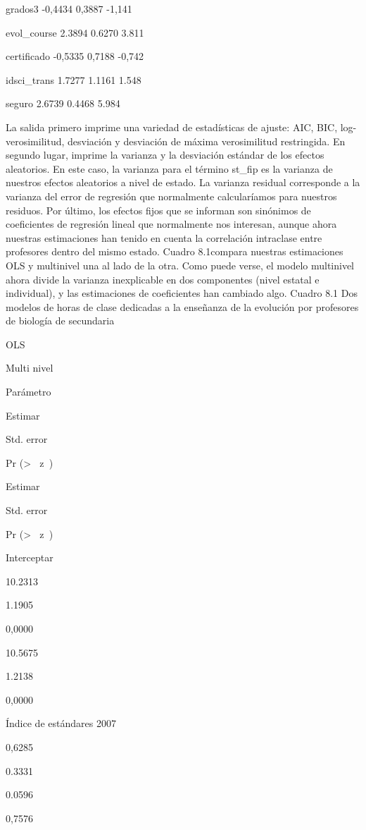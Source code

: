 \documentclass[
]{book}
\begin{document}
grados3 -0,4434 0,3887 -1,141

evol\_course 2.3894 0.6270 3.811

certificado -0,5335 0,7188 -0,742

idsci\_trans 1.7277 1.1161 1.548

seguro 2.6739 0.4468 5.984

La salida primero imprime una variedad de estadísticas de ajuste: AIC, BIC, log-verosimilitud, desviación y desviación de máxima verosimilitud restringida. En segundo lugar, imprime la varianza y la desviación estándar de los efectos aleatorios. En este caso, la varianza para el término st\_fip es la varianza de nuestros efectos aleatorios a nivel de estado. La varianza residual corresponde a la varianza del error de regresión que normalmente calcularíamos para nuestros residuos. Por último, los efectos fijos que se informan son sinónimos de coeficientes de regresión lineal que normalmente nos interesan, aunque ahora nuestras estimaciones han tenido en cuenta la correlación intraclase entre profesores dentro del mismo estado. Cuadro 8.1compara nuestras estimaciones OLS y multinivel una al lado de la otra. Como puede verse, el modelo multinivel ahora divide la varianza inexplicable en dos componentes (nivel estatal e individual), y las estimaciones de coeficientes han cambiado algo.
Cuadro 8.1
Dos modelos de horas de clase dedicadas a la enseñanza de la evolución por profesores de biología de secundaria

OLS

Multi nivel

Parámetro

Estimar

Std. error

Pr (\textgreater{} \textbar{}  z  \textbar)

Estimar

Std. error

Pr (\textgreater{} \textbar{}  z  \textbar)

Interceptar

10.2313

1.1905

0,0000

10.5675

1.2138

0,0000

Índice de estándares 2007

0,6285

0.3331

0.0596

0,7576
\end{document}
